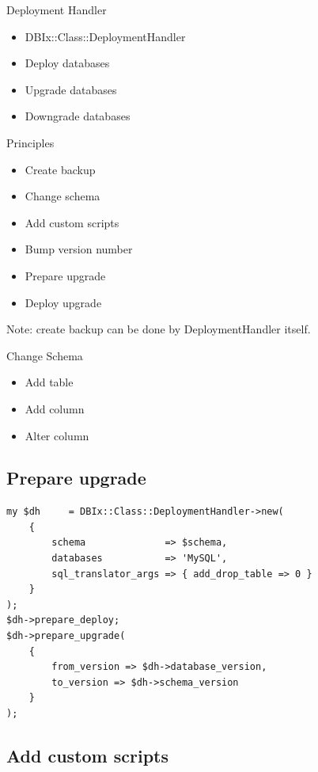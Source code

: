\begin{frame}{Deployment Handler}
\begin{itemize}
\item DBIx::Class::DeploymentHandler
\item Deploy databases
\item Upgrade databases
\item Downgrade databases
\end{itemize}
\end{frame}

\begin{frame}{Principles}
\begin{itemize}
\item Create backup
\item Change schema
\item Add custom scripts
\item Bump version number
\item Prepare upgrade
\item Deploy upgrade
\end{itemize}
\end{frame}

Note: create backup can be done by DeploymentHandler itself.

\begin{frame}{Change Schema}
\begin{itemize}
\item Add table
\item Add column
\item Alter column
\end{itemize}
\end{frame}

\subsection{Prepare upgrade}
\begin{lstlisting}
my $dh     = DBIx::Class::DeploymentHandler->new(
    {
        schema              => $schema,
        databases           => 'MySQL',
        sql_translator_args => { add_drop_table => 0 }
    }
);
$dh->prepare_deploy;
$dh->prepare_upgrade(
    {
        from_version => $dh->database_version,
        to_version => $dh->schema_version
    }
);
\end{lstlisting}

\subsection{Add custom scripts}

